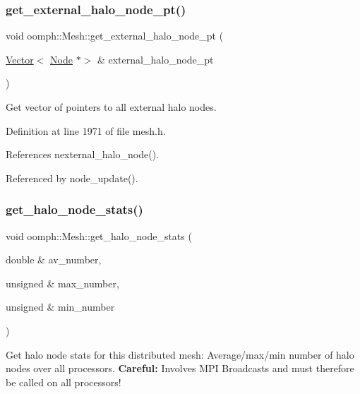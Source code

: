 \subsubsection{\texorpdfstring{get\+\_\+external\+\_\+halo\+\_\+node\+\_\+pt()}{get\_external\_halo\_node\_pt()}}
{\footnotesize\ttfamily void oomph\+::\+Mesh\+::get\+\_\+external\+\_\+halo\+\_\+node\+\_\+pt (\begin{DoxyParamCaption}\item[{\hyperlink{classoomph_1_1Vector}{Vector}$<$ \hyperlink{classoomph_1_1Node}{Node} $\ast$$>$ \&}]{external\+\_\+halo\+\_\+node\+\_\+pt }\end{DoxyParamCaption})\hspace{0.3cm}{\ttfamily [inline]}}



Get vector of pointers to all external halo nodes. 



Definition at line 1971 of file mesh.\+h.



References nexternal\+\_\+halo\+\_\+node().



Referenced by node\+\_\+update().

\mbox{\label{classoomph_1_1Mesh_ac8b298686d35c27b0cbcb7453786b543}} 
\subsubsection{\texorpdfstring{get\+\_\+halo\+\_\+node\+\_\+stats()}{get\_halo\_node\_stats()}}
{\footnotesize\ttfamily void oomph\+::\+Mesh\+::get\+\_\+halo\+\_\+node\+\_\+stats (\begin{DoxyParamCaption}\item[{double \&}]{av\+\_\+number,  }\item[{unsigned \&}]{max\+\_\+number,  }\item[{unsigned \&}]{min\+\_\+number }\end{DoxyParamCaption})}



Get halo node stats for this distributed mesh\+: Average/max/min number of halo nodes over all processors. {\bfseries Careful\+:} Involves M\+PI Broadcasts and must therefore be called on all processors! 

